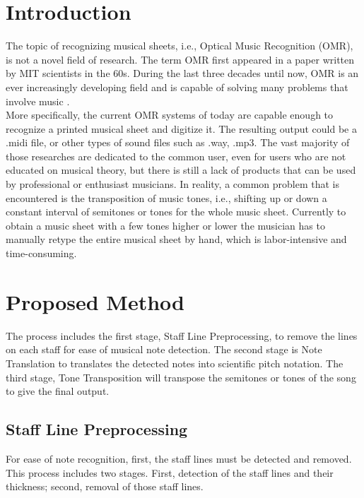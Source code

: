 \documentclass[a4paper,12pt]{report}
\begin{document}



\section{Introduction}

The topic of recognizing musical sheets, i.e., Optical Music Recognition (OMR),
is not a novel field of research. The term OMR first appeared in a paper written
by MIT scientists in the 60s.  During the last three decades until now, OMR is
an ever increasingly developing field and is capable of solving many problems
that involve music \cite{Shatri2020a}.\\

More specifically, the current OMR systems of today are capable enough to
recognize a printed musical sheet and digitize it. The resulting output could be
a .midi file, or other types of sound files such as .way, .mp3. The vast
majority of those researches are dedicated to the common user, even for users
who are not educated on musical theory, but there is still a lack of products
that can be used by professional or enthusiast musicians. In reality, a common
problem that is encountered is the transposition of music tones, i.e., shifting up or down a constant interval of
semitones or tones for the whole music sheet. Currently to obtain a music
sheet with a few tones higher or lower the musician has to manually retype the
entire musical sheet by hand, which is labor-intensive and time-consuming.


\clearpage

\section{Proposed Method}
The process includes the first stage, Staff Line Preprocessing, to remove the
lines on each staff for ease of musical note detection. The second stage is Note
Translation to translates the detected notes into scientific pitch notation. The
third stage, Tone Transposition will transpose the semitones or tones of the
song to give the final output. 

\subsection{Staff Line Preprocessing}
For ease of note recognition, first, the staff lines must be detected and
removed. This process includes two stages. First, detection of the staff lines
and their thickness; second, removal of those staff lines.
\end{document}
